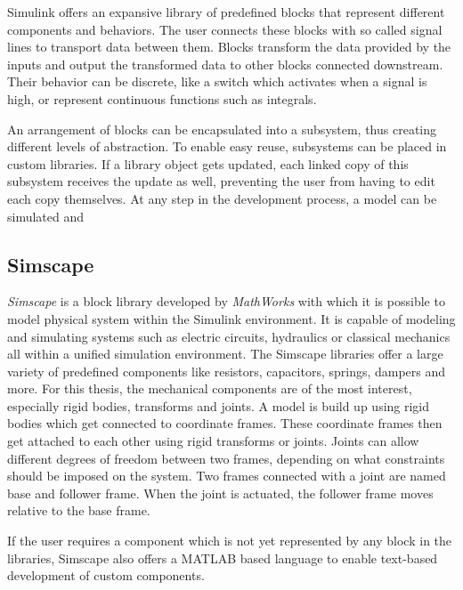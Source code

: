 Simulink offers an expansive library of predefined blocks that represent different components and behaviors.
The user connects these blocks with so called signal lines to transport data between them.
Blocks transform the data provided by the inputs and output the transformed data to other blocks connected downstream.
Their behavior can be discrete, like a switch which activates when a signal is high, or represent continuous functions such as integrals.

An arrangement of blocks can be encapsulated into a subsystem, thus creating different levels of abstraction.
To enable easy reuse, subsystems can be placed in custom libraries.
If a library object gets updated, each linked copy of this subsystem receives the update as well, preventing the user from having to edit each copy themselves.
At any step in the development process, a model can be simulated and 

\subsection{Simscape}
\textit{Simscape\textsuperscript{\texttrademark}} is a block library developed by \textit{MathWorks\textsuperscript{\textregistered}} with which it is possible to model physical system within the Simulink environment.
It is capable of modeling and simulating systems such as electric circuits, hydraulics or classical mechanics all within a unified simulation environment.
The Simscape libraries offer a large variety of predefined components like resistors, capacitors, springs, dampers and more.
For this thesis, the mechanical components are of the most interest, especially rigid bodies, transforms and joints.
A model is build up using rigid bodies which get connected to coordinate frames.
These coordinate frames then get attached to each other using rigid transforms or joints.
Joints can allow different degrees of freedom between two frames, depending on what constraints should be imposed on the system.
Two frames connected with a joint are named base and follower frame.
When the joint is actuated, the follower frame moves relative to the base frame\parencite{thilderkvist2015motion}.

If the user requires a component which is not yet represented by any block in the libraries, Simscape also offers a MATLAB based language to enable text-based development of custom components.


